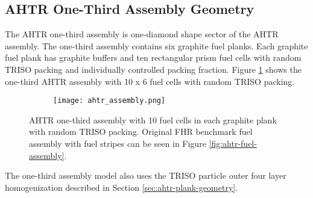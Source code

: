 \subsection{AHTR One-Third Assembly Geometry}
\label{sec:ahtr-assem-geometry}
The \gls{AHTR} one-third assembly is one-diamond shape sector of the \gls{AHTR} assembly. 
The one-third assembly contains six graphite fuel planks.
Each graphite fuel plank has graphite buffers and ten rectangular prism fuel cells 
with random TRISO packing and individually controlled packing fraction. 
Figure \ref{fig:ahtr_assembly} shows the one-third \gls{AHTR} assembly with 10 x 6 
fuel cells with random \gls{TRISO} packing.
\begin{figure}[htbp]
    \centering
    \begin{subfigure}{.7\textwidth}
    \texttt{[image: ahtr\_assembly.png]}
    \end{subfigure}%
    \begin{subfigure}{.3\textwidth}
        \vspace{1cm}
    \end{subfigure}
    \caption{\acrfull{AHTR} one-third assembly with 10 fuel cells in each graphite plank 
    with random TRISO packing. Original \gls{FHR} benchmark fuel assembly with fuel 
    stripes can be seen in Figure \ref{fig:ahtr-fuel-assembly}.}
    \label{fig:ahtr_assembly}
\end{figure}
The one-third assembly model also uses the \gls{TRISO} particle outer four layer 
homogenization described in Section \ref{sec:ahtr-plank-geometry}.

